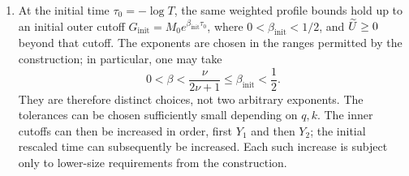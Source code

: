 \begin{proposition}
\begin{enumerate}[label=\textup{(\roman*)}]
\item At the initial time \(\tau_0=-\log T\), the same weighted profile
bounds hold up to an initial outer cutoff
\(G_{\mathrm{init}}=M_0e^{\beta_{\mathrm{init}}\tau_0}\),
where \(0<\beta_{\mathrm{init}}<1/2\), and \(\widetilde U\ge0\) beyond that
cutoff. The exponents are chosen in the ranges permitted by the
construction; in particular, one may take
\[
0<\beta<\frac{\nu}{2\nu+1}\le\beta_{\mathrm{init}}<\frac12.
\]
They are therefore distinct choices, not two arbitrary exponents.
The tolerances can be
chosen sufficiently small depending on \(q,k\). The inner cutoffs can then
be increased in order, first \(Y_1\) and then \(Y_2\); the initial
rescaled time can subsequently be increased. Each such increase is
subject only to lower-size requirements from the construction.
\end{enumerate}
\end{proposition}

